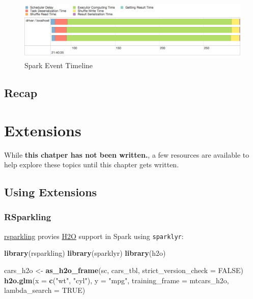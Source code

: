 \documentclass[]{book}
\newenvironment{Shaded}{\begin{snugshade}}{\end{snugshade}}
\newcommand{\DataTypeTok}[1]{\textcolor[rgb]{0.13,0.29,0.53}{#1}}
\newcommand{\KeywordTok}[1]{\textcolor[rgb]{0.13,0.29,0.53}{\textbf{#1}}}
\newcommand{\NormalTok}[1]{#1}
\newcommand{\OtherTok}[1]{\textcolor[rgb]{0.56,0.35,0.01}{#1}}
\newcommand{\StringTok}[1]{\textcolor[rgb]{0.31,0.60,0.02}{#1}}
\theoremstyle{definition}
\theoremstyle{definition}
\theoremstyle{definition}
\theoremstyle{remark}
\begin{document}
\begin{figure}

{\centering \includegraphics[width=0.9\linewidth]{images/07-tuning-spark-event-timeline} 

}

\caption{Spark Event Timeline}\label{fig:unnamed-chunk-85}
\end{figure}

\hypertarget{recap-3}{%
\section{Recap}\label{recap-3}}

\hypertarget{extensions}{%
\chapter{Extensions}\label{extensions}}

While \textbf{this chatper has not been written.}, a few resources are
available to help explore these topics until this chapter gets written.

\hypertarget{using-extensions}{%
\section{Using Extensions}\label{using-extensions}}

\hypertarget{rsparkling}{%
\subsection{RSparkling}\label{rsparkling}}

\href{https://github.com/h2oai/rsparkling}{rsparkling} provies
\href{https://www.h2o.ai/}{H2O} support in Spark using
\texttt{sparklyr}:

\begin{Shaded}
\begin{Highlighting}[]
\KeywordTok{library}\NormalTok{(rsparkling)}
\KeywordTok{library}\NormalTok{(sparklyr)}
\KeywordTok{library}\NormalTok{(h2o)}

\NormalTok{cars_h2o <-}\StringTok{ }\KeywordTok{as_h2o_frame}\NormalTok{(sc, cars_tbl, }\DataTypeTok{strict_version_check =} \OtherTok{FALSE}\NormalTok{)}
\KeywordTok{h2o.glm}\NormalTok{(}\DataTypeTok{x =} \KeywordTok{c}\NormalTok{(}\StringTok{"wt"}\NormalTok{, }\StringTok{"cyl"}\NormalTok{), }\DataTypeTok{y =} \StringTok{"mpg"}\NormalTok{, }\DataTypeTok{training_frame =}\NormalTok{ mtcars_h2o, }\DataTypeTok{lambda_search =} \OtherTok{TRUE}\NormalTok{)}
\end{Highlighting}
\end{Shaded}
\end{document}
